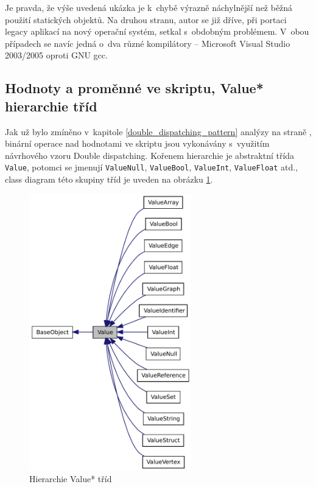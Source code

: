 \documentclass[11pt,twoside,a4paper]{book}
\begin{document}
Je pravda, že výše uvedená ukázka je k~chybě výrazně náchylnější než běžná použití statických objektů. Na druhou stranu, autor se již dříve, při portaci legacy aplikací na nový operační systém, setkal s~obdobným problémem. V~obou případech se navíc jedná o~dva různé kompilátory -- Microsoft Visual Studio 2003/2005 oproti GNU gcc.


\subsection{Hodnoty a proměnné ve skriptu, Value* hierarchie tříd}

Jak už bylo zmíněno v~kapitole \ref{double_dispatching_pattern} analýzy na straně \pageref{double_dispatching_pattern}, binární operace nad hodnotami ve skriptu jsou vykonávány s~využitím návrhového vzoru Double dispatching. Kořenem hierarchie je abstraktní třída \texttt{Value}, potomci se jmenují \texttt{ValueNull}, \texttt{Va\-lue\-Bool}, \texttt{ValueInt}, \texttt{ValueFloat} atd., class diagram této skupiny tříd je uveden na obrázku \ref{fig:value_hierarchy}.

\begin{figure}[ht]
\begin{center}
\includegraphics[height=12cm]{img/classValue__inherit__graph.pdf}
\caption{Hierarchie Value* tříd}
\label{fig:value_hierarchy}
\end{center}
\end{figure}
\end{document}
